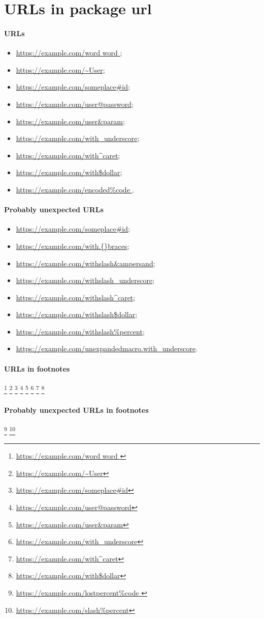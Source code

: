 \documentclass{article}
\def\macro{with_underscore}%
\begin{document}
\section{URLs in package url}
\paragraph{URLs}
\begin{itemize}
\item\url{  https://example.com/word word };
\item\url{https://example.com/~User};
\item\url{https://example.com/someplace#id};
\item\url{https://example.com/user@password};
\item\url{https://example.com/user&param};
\item\url{https://example.com/with_underscore};
\item\url{https://example.com/with^caret};
\item\url{https://example.com/with$dollar};
\item\url{https://example.com/encoded%
}.
\end{itemize}
\paragraph{Probably unexpected URLs}
\begin{itemize}
\item\url{https://example.com/someplace\#id};
\item\url{https://example.com/with.{}braces};
\item\url{https://example.com/withslash\&ampersand};
\item\url{https://example.com/withslash\_underscore};
\item\url{https://example.com/withslash\^caret};
\item\url{https://example.com/withslash\$dollar};
\item\url{https://example.com/withslash\%percent};
\item\url{https://example.com/unexpandedmacro.\macro}.
\end{itemize}

\paragraph{URLs in footnotes}
\footnote{\url{  https://example.com/word word }}
\footnote{\url{https://example.com/~User}}
\footnote{\url{https://example.com/someplace#id}}%
\footnote{\url{https://example.com/user@password}}
\footnote{\url{https://example.com/user&param}}
\footnote{\url{https://example.com/with_underscore}}
\footnote{\url{https://example.com/with^caret}}
\footnote{\url{https://example.com/with$dollar}}

\paragraph{Probably unexpected URLs in footnotes}
\footnote{\url{https://example.com/lostpercent%
}}
\footnote{\url{https://example.com/slash\%percent}}
\end{document}
